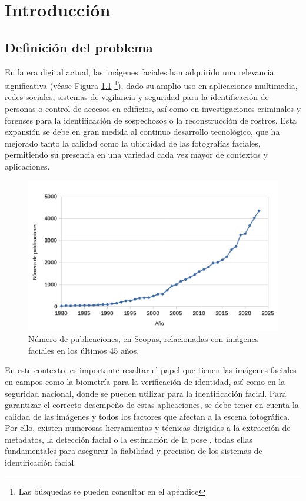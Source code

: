\chapter{Introducción}
\thispagestyle{empty}

\section{Definición del problema}

En la era digital actual, las imágenes faciales han adquirido una relevancia significativa (véase Figura \ref{fig1} \footnote{Las búsquedas se pueden consultar en el apéndice}), dado su amplio uso  en aplicaciones multimedia, redes sociales, sistemas de vigilancia y seguridad para la identificación de personas o control de accesos en edificios, así como en investigaciones criminales y forenses para la identificación de sospechosos o la reconstrucción de rostros.
Esta expansión se debe en gran medida al continuo desarrollo tecnológico, que ha mejorado tanto la calidad como la ubicuidad de las fotografías faciales, permitiendo su presencia en una variedad cada vez mayor de contextos y aplicaciones.

\begin{figure}[h]
	\centering
	\includegraphics[scale=0.6]{imagenes/cap1/tabla_facial_images.png}
	\caption[Número de publicaciones de imágenes faciales.]{Número de publicaciones, en Scopus, relacionadas con imágenes faciales en los últimos 45 años.}
	\label{fig1}
\end{figure}

En este contexto, es importante resaltar el papel que tienen las imágenes faciales en campos como la biometría para la verificación de identidad, así como en la seguridad nacional, donde se pueden utilizar para la identificación facial. 
Para garantizar el correcto desempeño de estas aplicaciones, se debe tener en cuenta la calidad de las imágenes y todos los factores que afectan a la escena fotográfica.
Por ello, existen numerosas herramientas y técnicas dirigidas a la extracción de metadatos, la detección facial o la estimación de la pose \cite{56}, todas ellas fundamentales para asegurar la fiabilidad y precisión de los sistemas de identificación facial.

